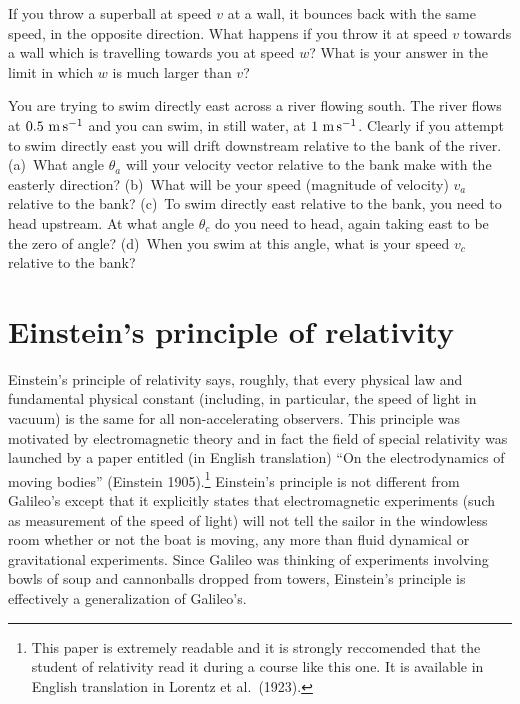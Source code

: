 \begin{problem}
If you throw a superball at speed $v$ at a wall, it bounces back with
the same speed, in the opposite direction.  What happens if you throw
it at speed $v$ towards a wall which is travelling towards you at
speed $w$?  What is your answer in the limit in which $w$ is much larger
than $v$?
\end{problem}

\begin{problem}
You are trying to swim directly east across a river flowing south.
The river flows at $0.5~{\rm m\,s^{-1}}$ and you can swim, in still water, at
$1~{\rm m\,s^{-1}}$.  Clearly if you attempt to swim directly east you will drift
downstream relative to the bank of the river.  (a)~What angle
$\theta_a$ will your velocity vector relative to the bank make with
the easterly direction?  (b)~What will be your speed (magnitude of
velocity) $v_a$ relative to the bank?  (c)~To swim directly east
relative to the bank, you need to head upstream.  At what angle
$\theta_c$ do you need to head, again taking east to be the zero of
angle?  (d)~When you swim at this angle, what is your speed $v_c$
relative to the bank?
\end{problem}


\section{Einstein's principle of relativity}
\label{sec:einstein}

Einstein's principle of relativity says, roughly, that every physical
law and fundamental physical constant (including, in particular, the
speed of light in vacuum) is the same for all non-accelerating
observers.  This principle was motivated by electromagnetic theory and
in fact the field of special relativity was launched by a paper
entitled (in English translation) ``On the electrodynamics of moving
bodies'' (Einstein 1905).\footnote{This paper is extremely readable
and it is strongly reccomended that the student of relativity read it
during a course like this one.  It is available in English translation
in Lorentz et al.\ (1923).}  Einstein's principle is not different
from Galileo's except that it explicitly states that electromagnetic
experiments (such as measurement of the speed of light) will not tell
the sailor in the windowless room whether or not the boat is moving,
any more than fluid dynamical or gravitational experiments.  Since
Galileo was thinking of experiments involving bowls of soup and
cannonballs dropped from towers, Einstein's principle is effectively a
generalization of Galileo's.

